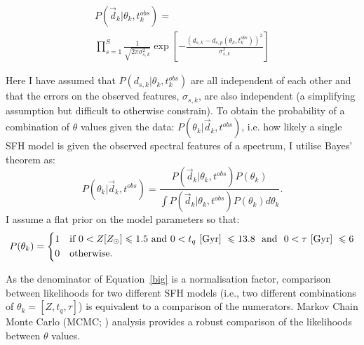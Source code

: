 \documentclass[useAMS,usenatbib]{mn2e}
\begin{document}

\begin{multline}\label{like}
P(\vec{d}_{k}|\theta_k, t^{obs}_{k}) = \\ \prod_{s=1}^{S} \frac{1}{\sqrt{2\pi\sigma_{s, k}^2}} \exp{\left[ - \frac{(d_{s, k} - d_{s, p}(\theta_k, t_{k}^{obs}))^2}{\sigma_{s, k}^2} \right]}
\end{multline}

Here I have assumed that $P(d_{s, k}|\theta_k, t^{obs}_{k})$ are all independent of each other and that the errors on the observed features, $\sigma_{s, k}$, are also independent (a simplifying assumption but difficult to otherwise constrain). To obtain the probability of a combination of $\theta$ values given the data: $P(\theta_k|\vec{d}_k, t^{obs})$, i.e. how likely a single SFH model is  given the observed spectral features of a spectrum, I utilise Bayes' theorem as:
 \begin{equation}\label{big}
P(\theta_k|\vec{d}_k, t^{obs}) = \frac{P(\vec{d}_k|\theta_k, t^{obs})P(\theta_k)}{\int P(\vec{d}_k |\theta_k, t^{obs})P(\theta_k) d\theta_k}.
\end{equation}
I assume a flat prior on the model parameters so that:
\begin{equation}\label{prior}
P(\theta_k) =
\begin{dcases}
1 & \text{if } 0 < Z [Z_{\odot}] \leq 1.5 \text{ and } 0 < t_q ~\rm{[Gyr]}~ \leq 13.8 ~ \text{ and } ~ 0 < \tau  ~\rm{[Gyr]}~ \leq 6\\
0 & \text{otherwise.} \\
\end{dcases}
\end{equation}

As the denominator of Equation~\ref{big} is a normalisation factor, comparison between likelihoods for two different SFH models (i.e., two different combinations of $\theta_k = [Z, t_q, \tau]$) is equivalent to a comparison of the numerators. Markov Chain Monte Carlo (MCMC; \citealt{mackay03, emcee13, GW10}) analysis provides a robust comparison of the likelihoods between $\theta$ values.
\end{document}
